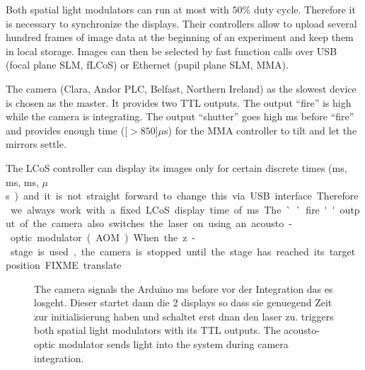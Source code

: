 Both spatial light modulators can run at most with $50\%$ duty         
cycle. Therefore it is necessary to synchronize the displays. Their
controllers allow to upload several hundred frames of image data at
the beginning of an experiment and keep them in local storage. Images
can then be selected by fast function calls over USB (focal plane SLM,
fLCoS) or Ethernet (pupil plane SLM, MMA).

The camera (Clara, Andor PLC, Belfast, Northern Ireland) as the        
slowest device is chosen as the master. It provides two TTL
outputs. The output ``fire'' is high while the camera is
integrating. The output ``shutter'' goes high \unit[1]{ms} before
``fire'' and provides enough time (\unit[$>850$]{$\mu$s}) for the MMA
controller to tilt and let the mirrors settle.

The LCoS controller can display its images only for certain discrete    
times (\unit[20]{ms}, \unit[10]{ms}, \unit[5]{ms}, \unit[200]{$\mu$s})
and it is not straight forward to change this via USB
interface. Therefore we always work with a fixed LCoS display time of
\unit[20]{ms}. The ``fire'' output of the camera also switches the
laser on using an acousto-optic modulator (AOM).

When the z-stage is used, the camera is stopped until the stage has
reached its target position.

FIXME translate

\begin{figure}[H]
 \centering
 \caption{The camera signals the Arduino \unit[1]{ms} before vor der
   Integration das es losgeht. Dieser startet dann die 2 displays so
   dass sie genuegend Zeit zur initialisierung haben und schaltet erst
   dnan den laser zu. triggers both spatial light modulators with its
   TTL outputs. The acousto-optic modulator sends light into the
   system during camera integration.}
 \label{fig:memi-electronics}
\end{figure}













